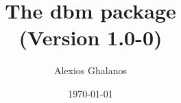 \documentclass[11pt,a4paper]{article}
\begin{document}
\title{The dbm package\\
(Version 1.0-0)}
\author{Alexios Ghalanos}
\date{\today}
\maketitle
\tableofcontents
\newpage

\clearpage

\end{document}
